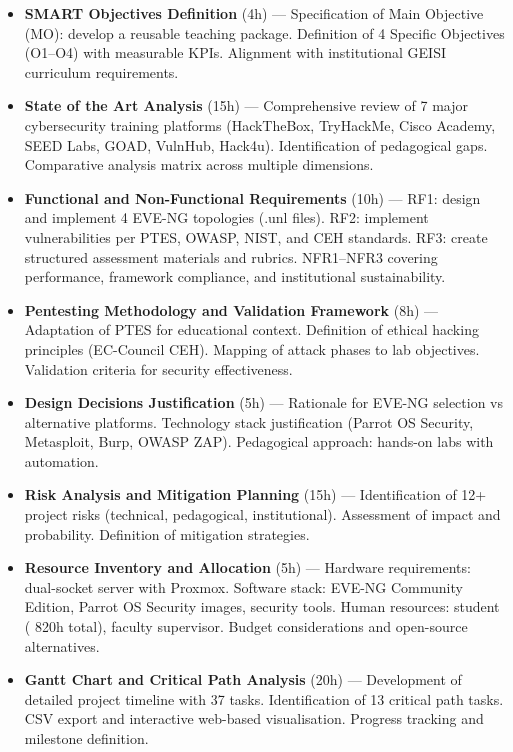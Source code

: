 \begin{itemize}
\item
  \textbf{SMART Objectives Definition} (4h) --- Specification of Main Objective (MO): develop a reusable teaching package. Definition of 4 Specific Objectives (O1--O4) with measurable KPIs. Alignment with institutional GEISI curriculum requirements.
\item
  \textbf{State of the Art Analysis} (15h) --- Comprehensive review of 7 major cybersecurity training platforms (HackTheBox, TryHackMe, Cisco Academy, SEED Labs, GOAD, VulnHub, Hack4u). Identification of pedagogical gaps. Comparative analysis matrix across multiple dimensions.
\item
  \textbf{Functional and Non-Functional Requirements} (10h) --- RF1: design and implement 4 EVE-NG topologies (.unl files). RF2: implement vulnerabilities per PTES, OWASP, NIST, and CEH standards. RF3: create structured assessment materials and rubrics. NFR1--NFR3 covering performance, framework compliance, and institutional sustainability.
\item
  \textbf{Pentesting Methodology and Validation Framework} (8h) --- Adaptation of PTES for educational context. Definition of ethical hacking principles (EC-Council CEH). Mapping of attack phases to lab objectives. Validation criteria for security effectiveness.
\item
  \textbf{Design Decisions Justification} (5h) --- Rationale for EVE-NG selection vs alternative platforms. Technology stack justification (Parrot OS Security, Metasploit, Burp, OWASP ZAP). Pedagogical approach: hands-on labs with automation.
\item
  \textbf{Risk Analysis and Mitigation Planning} (15h) --- Identification of 12+ project risks (technical, pedagogical, institutional). Assessment of impact and probability. Definition of mitigation strategies.
\item
  \textbf{Resource Inventory and Allocation} (5h) --- Hardware requirements: dual-socket server with Proxmox. Software stack: EVE-NG Community Edition, Parrot OS Security images, security tools. Human resources: student ( 820h total), faculty supervisor. Budget considerations and open-source alternatives.
\item
  \textbf{Gantt Chart and Critical Path Analysis} (20h) --- Development of detailed project timeline with 37 tasks. Identification of 13 critical path tasks. CSV export and interactive web-based visualisation. Progress tracking and milestone definition.
\end{itemize}

